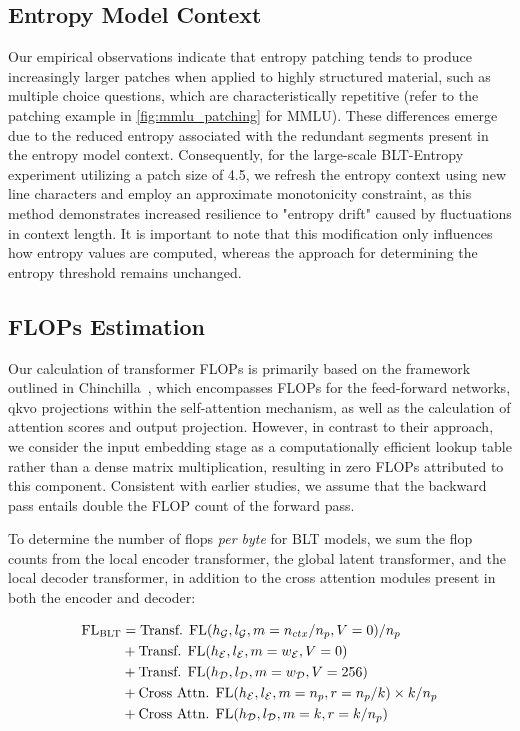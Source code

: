 \subsection{Entropy Model Context}
\label{section:entropy-context}
Our empirical observations indicate that entropy patching tends to produce increasingly larger patches when applied to highly structured material, such as multiple choice questions, which are characteristically repetitive (refer to the patching example in \autoref{fig:mmlu_patching} for MMLU). These differences emerge due to the reduced entropy associated with the redundant segments present in the entropy model context. Consequently, for the large-scale {\textsc BLT}-Entropy experiment utilizing a patch size of 4.5, we refresh the entropy context using new line characters and employ an approximate monotonicity constraint, as this method demonstrates increased resilience to "entropy drift" caused by fluctuations in context length. It is important to note that this modification only influences how entropy values are computed, whereas the approach for determining the entropy threshold remains unchanged.

\subsection{FLOPs Estimation} 
\label{section:flops}

Our calculation of transformer FLOPs is primarily based on the framework outlined in Chinchilla~\citep{hoffmann2022training}, which encompasses FLOPs for the feed-forward networks, qkvo projections within the self-attention mechanism, as well as the calculation of attention scores and output projection. However, in contrast to their approach, we consider the input embedding stage as a computationally efficient lookup table rather than a dense matrix multiplication, resulting in zero FLOPs attributed to this component. Consistent with earlier studies, we assume that the backward pass entails double the FLOP count of the forward pass.

To determine the number of flops \textit{per byte} for {\textsc BLT} models, we sum the flop counts from the local encoder transformer, the global latent transformer, and the local decoder transformer, in addition to the cross attention modules present in both the encoder and decoder:

\begin{align}
    \text{FL}_{\text{{\textsc BLT}}} &= \text{Transf. FL}(h_{\mathcal{G}}, l_{\mathcal{G}}, m=n_{ctx}/n_p,V=0) / n_p\\
   &+ \text{Transf. FL}(h_{\mathcal{E}}, l_{\mathcal{E}}, m=w_{\mathcal{E}}, V=0) \\
   &+ \text{Transf. FL}(h_{\mathcal{D}}, l_{\mathcal{D}}, m=w_{\mathcal{D}}, V=256) \\ 
    &+ \text{Cross Attn. FL}(h_{\mathcal{E}}, l_{\mathcal{E}}, m=n_p, r=n_p/k) \times k/n_p \\ 
   &+ \text{Cross Attn. FL}(h_{\mathcal{D}}, l_{\mathcal{D}}, m=k, r=k/n_p) 
\end{align}

